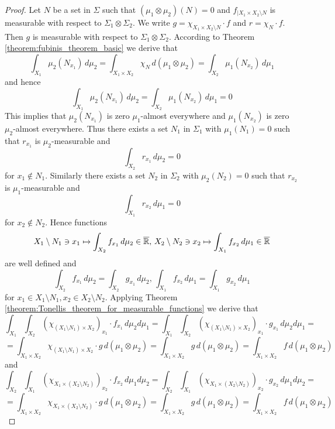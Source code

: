 \begin{proof}
Let $N$ be a set in $\Sigma$ such that $\left(\mu_1\otimes \mu_2\right)(N) = 0$ and $f_{\mid X_1\times X_2\setminus N}$ is measurable with respect to $\Sigma_1\otimes \Sigma_2$. We write $g = \chi_{X_1\times X_2\setminus N}\cdot f$ and $r = \chi_N\cdot f$. Then $g$ is measurable with respect to $\Sigma_1\otimes \Sigma_2$. According to Theorem \ref{theorem:fubinis_theorem_basic} we derive that
$$\int_{X_1}\mu_2(N_{x_1})\,d\mu_2 = \int_{X_1\times X_2}\chi_N\,d\left(\mu_1\otimes \mu_2\right) = \int_{X_2}\mu_1(N_{x_2})\,d\mu_1$$
and hence
$$\int_{X_1}\mu_2(N_{x_1})\,d\mu_2 = \int_{X_2}\mu_1(N_{x_2})\,d\mu_1 = 0$$
This implies that $\mu_2(N_{x_1})$ is zero $\mu_1$-almost everywhere and $\mu_1(N_{x_2})$ is zero $\mu_2$-almost everywhere. Thus there exists a set $N_1$ in $\Sigma_1$ with $\mu_1(N_1) = 0$ such that $r_{x_1}$ is $\mu_2$-measurable and
$$\int_{X_2}r_{x_1}\,d\mu_2 = 0$$
for $x_1\not \in N_1$. Similarly there exists a set $N_2$ in $\Sigma_2$ with $\mu_2(N_2) = 0$ such that $r_{x_2}$ is $\mu_1$-measurable and
$$\int_{X_1}r_{x_2}\,d\mu_1 = 0$$
for $x_2\not \in N_2$. Hence functions
$$X_1\setminus N_1\ni x_1\mapsto \int_{X_2}f_{x_1}\,d\mu_2\in \overline{{\mathbb R}},\,X_2\setminus N_2\ni x_2\mapsto \int_{X_1}f_{x_2}\,d\mu_1\in \overline{{\mathbb R}}$$
are well defined and
$$\int_{X_2}f_{x_1}\,d\mu_2 = \int_{X_2}g_{x_1}\,d\mu_2,\,\int_{X_1}f_{x_2}\,d\mu_1 = \int_{X_1}g_{x_2}\,d\mu_1$$
for $x_1 \in X_1\setminus N_1,x_2\in X_2\setminus N_2$. Applying Theorem \ref{theorem:Tonellis_theorem_for_measurable_functions} we derive that
$$\int_{X_1}\int_{X_2} \left(\chi_{\left(X_1\setminus N_1\right)\times X_2}\right)_{x_1}\cdot f_{x_1}\,d\mu_2d\mu_1 = \int_{X_1} \int_{X_2} \left(\chi_{\left(X_1\setminus N_1\right)\times X_2}\right)_{x_1}\cdot  g_{x_1}\,d\mu_2d\mu_1 =$$
$$= \int_{X_1\times X_2}\chi_{\left(X_1\setminus N_1\right)\times X_2}\cdot g\,d\left(\mu_1\otimes \mu_2\right) = \int_{X_1\times X_2}g\,d\left(\mu_1\otimes \mu_2\right) = \int_{X_1\times X_2}f\,d\left(\mu_1\otimes \mu_2\right)$$
and
$$\int_{X_2} \int_{X_1} \left(\chi_{X_1\times \left(X_2\setminus N_2\right)}\right)_{x_2}\cdot f_{x_2}\,d\mu_1d\mu_2 = \int_{X_2} \int_{X_1} \left(\chi_{X_1\times \left(X_2\setminus N_2\right)}\right)_{x_2}\cdot g_{x_2}\,d\mu_1d\mu_2 =$$
$$= \int_{X_1\times X_2}\chi_{X_1\times \left(X_2 \setminus N_2\right)}\cdot g\,d\left(\mu_1\otimes \mu_2\right) = \int_{X_1\times X_2}g\,d\left(\mu_1\otimes \mu_2\right) = \int_{X_1\times X_2}f\,d\left(\mu_1\otimes \mu_2\right)$$
\end{proof}

